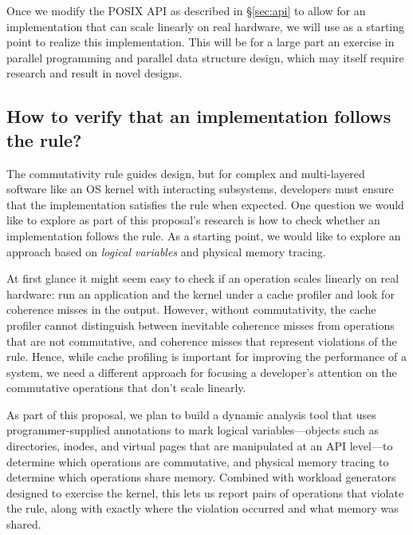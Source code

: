 Once we modify the POSIX API as described in \S\ref{sec:api} to
allow for an implementation that can scale linearly on real hardware,
we will use \sys as a starting point to realize this implementation.
This will be for a large part an exercise in parallel programming and
parallel data structure design, which may
itself require research and result in novel designs.

\begin{comment}
The downside of using \sys is that we will miss features that are
important (e.g., swapping) and for which a scalable implementation is
challenging (e.g., swapping needs a reverse map).  Our hope is that
we will learn enough from the xv6 subsystems that those lessons can be
carried over to subsystems that xv6 won't support.
\end{comment}


\subsection{How to verify that an implementation follows the rule?}

The commutativity rule guides design, but for complex and multi-layered
software like an OS kernel with interacting subsystems, developers must
ensure that the implementation satisfies the rule when expected.
One question we would like to explore as part of this proposal's research
is how to check whether an implementation follows the rule.  As a starting
point, we would like to explore an approach based on \emph{logical variables}
and physical memory tracing.

At first glance it might seem easy to check if an operation scales
linearly on real hardware: run an application and the kernel under a
cache profiler and look for coherence misses in the output.  However,
without commutativity, the cache profiler cannot distinguish between
inevitable coherence misses from operations that are not commutative,
and coherence misses that represent violations of the rule.  Hence, while
cache profiling is important for improving the performance of a system,
we need a different approach for focusing a developer's attention on
the commutative operations that don't scale linearly.

As part of this proposal, we plan to build a dynamic analysis tool that uses
programmer-supplied annotations to mark logical variables---objects
such as directories, inodes, and virtual pages that are manipulated at
an API level---to determine which operations are commutative, and
physical memory tracing to determine which operations share memory.  Combined
with workload generators designed to exercise the kernel, this lets us report
pairs of operations that violate the rule, along with exactly where the
violation occurred and what memory was shared.


